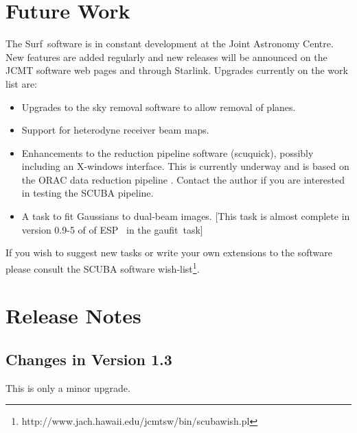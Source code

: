 \documentclass[twoside,11pt]{article}
\newcommand{\scusoft}          {{\sc Surf}}
\newcommand{\ESP}{\xref{ESP}{sun180}{}}
\newcommand{\task}[1]{{\sf #1}}
\newcommand{\scuquick}{\htmlref{\task{scuquick}}{SCUQUICK}}
\newcommand{\gaufit}{\xref{\task{gaufit}}{sun180}{GAUFIT}}
\newcommand{\htmladdnormallinkfoot}[2]{#1\footnote{#2}}
\newcommand{\htmlref}[2]{#1}
\newcommand{\xref}[3]{#1}
\newcommand{\xlabel}[1]{}
\renewcommand{\_}{\texttt{\symbol{95}}}
\begin{document}
\section{\xlabel{future}Future Work\label{future}}

The \scusoft\ software is in constant development at the
Joint Astronomy Centre. New features are added regularly and new releases
will be announced on the JCMT software web pages and through Starlink.
Upgrades currently on the work list are:

\begin{itemize}

\item Upgrades to the sky removal software to allow removal of planes.

\item Support for heterodyne receiver beam maps.

\item Enhancements to the reduction pipeline software (\scuquick), possibly
      including an X-windows interface. This is currently underway and is
      based on the ORAC data reduction pipeline \cite{oracdr}. Contact the
      author if you are interested in testing the SCUBA pipeline.

\item A task to fit Gaussians to dual-beam images. [This task is almost
complete in version 0.9-5 of of \ESP\ \cite{esp} in the 
\gaufit\ task]

\end{itemize}

If you wish to suggest new tasks or write your own extensions to the 
software please consult the \htmladdnormallinkfoot{SCUBA software
wish-list}{http://www.jach.hawaii.edu/jcmt\_sw/bin/scuba\_wish.pl}.

\section{\xlabel{relnotes}Release Notes\label{relnotes}}

\subsection{Changes in Version 1.3}

This is only a minor upgrade.
\end{document}
